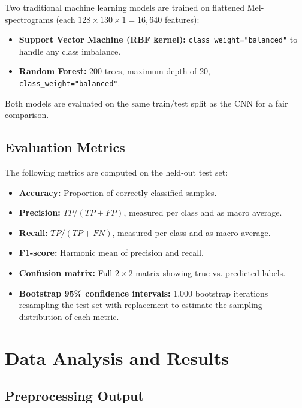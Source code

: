\documentclass[12pt,a4paper,oneside]{report}
\begin{document}
Two traditional machine learning models are trained on flattened Mel-spectrograms (each \(128 \times 130 \times 1 = 16,640\) features):

\begin{itemize}
    \item \textbf{Support Vector Machine (RBF kernel):} \texttt{class\_weight="balanced"} to handle any class imbalance.
    \item \textbf{Random Forest:} 200 trees, maximum depth of 20, \texttt{class\_weight="balanced"}.
\end{itemize}

Both models are evaluated on the same train/test split as the CNN for a fair comparison.

\section{Evaluation Metrics}

The following metrics are computed on the held-out test set:
\begin{itemize}
    \item \textbf{Accuracy:} Proportion of correctly classified samples.
    \item \textbf{Precision:} \(TP / (TP + FP)\), measured per class and as macro average.
    \item \textbf{Recall:} \(TP / (TP + FN)\), measured per class and as macro average.
    \item \textbf{F1-score:} Harmonic mean of precision and recall.
    \item \textbf{Confusion matrix:} Full \(2 \times 2\) matrix showing true vs. predicted labels.
    \item \textbf{Bootstrap 95\% confidence intervals:} 1,000 bootstrap iterations resampling the test set with replacement to estimate the sampling distribution of each metric.
\end{itemize}

\chapter{Data Analysis and Results}
\label{ch:results}

\section{Preprocessing Output}
\end{document}
